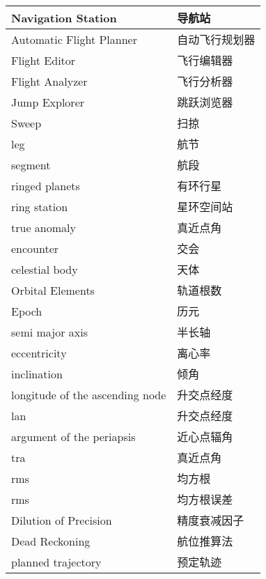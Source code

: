 \documentclass[a4paper]{article}
\theoremstyle{definition}
\begin{document}
{{\begin{longtable}{|p{4.5cm}|p{\textwidth-6.5cm}|}
	Navigation Station              & 导航站     \\ \hline
	Automatic Flight Planner        & 自动飞行规划器 \\ \hline
	Flight Editor                   & 飞行编辑器   \\ \hline
	Flight Analyzer                 & 飞行分析器   \\ \hline
	Jump Explorer                   & 跳跃浏览器   \\ \hline
	Sweep                           & 扫掠      \\ \hline
	leg                             & 航节      \\ \hline
	segment                         & 航段      \\ \hline
	ringed planets                  & 有环行星    \\ \hline
	ring station                    & 星环空间站   \\ \hline
	true anomaly                    & 真近点角    \\ \hline
	encounter                       & 交会      \\ \hline
	celestial body                  & 天体      \\ \hline
	Orbital Elements                & 轨道根数    \\ \hline
	Epoch                           & 历元      \\ \hline
	semi major axis                 & 半长轴     \\ \hline
	eccentricity                    & 离心率     \\ \hline
	inclination                     & 倾角      \\ \hline
	longitude of the ascending node & 升交点经度   \\ \hline
	lan                             & 升交点经度   \\ \hline
	argument of the periapsis       & 近心点辐角   \\ \hline
	tra                             & 真近点角    \\ \hline
	rms                             & 均方根     \\ \hline
	rms                             & 均方根误差   \\ \hline
	Dilution of Precision           & 精度衰减因子  \\ \hline
	Dead Reckoning                  & 航位推算法   \\ \hline
	planned trajectory              & 预定轨迹    \\ \hline

\end{longtable}}}
\end{document}
